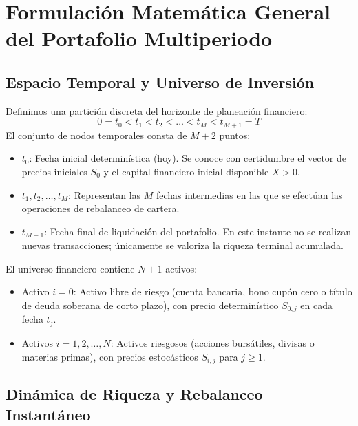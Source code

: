 \documentclass[11pt,a4paper]{report}
\numberwithin{equation}{chapter}
\begin{document}
\chapter{Formulación Matemática General del Portafolio Multiperiodo}

\section{Espacio Temporal y Universo de Inversión}

Definimos una partición discreta del horizonte de planeación financiero:
\begin{equation}
    0 = t_0 < t_1 < t_2 < \dots < t_M < t_{M+1} = T
\end{equation}
El conjunto de nodos temporales consta de $M+2$ puntos:
\begin{itemize}[leftmargin=2em]
    \item $t_0$: Fecha inicial determinística (hoy). Se conoce con certidumbre el vector de precios iniciales $S_0$ y el capital financiero inicial disponible $X > 0$.
    \item $t_1, t_2, \dots, t_M$: Representan las $M$ fechas intermedias en las que se efectúan las operaciones de rebalanceo de cartera.
    \item $t_{M+1}$: Fecha final de liquidación del portafolio. En este instante no se realizan nuevas transacciones; únicamente se valoriza la riqueza terminal acumulada.
\end{itemize}

El universo financiero contiene $N+1$ activos:
\begin{itemize}[leftmargin=2em]
    \item Activo $i=0$: Activo libre de riesgo (cuenta bancaria, bono cupón cero o título de deuda soberana de corto plazo), con precio determinístico $S_{0,j}$ en cada fecha $t_j$.
    \item Activos $i=1, 2, \dots, N$: Activos riesgosos (acciones bursátiles, divisas o materias primas), con precios estocásticos $S_{i,j}$ para $j \ge 1$.
\end{itemize}

\section{Dinámica de Riqueza y Rebalanceo Instantáneo}
\end{document}
